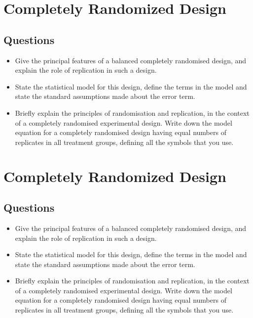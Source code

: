 \documentclass[]{article}
\begin{document}
\section{Completely Randomized Design}

\subsection{Questions}
\begin{itemize}
	\item Give the principal features of a  balanced completely randomised design, and
	explain the role of replication in such a design.  \item State the statistical model for
	this design, define the terms in the model and state the standard assumptions
	made about the error term.
	\item Briefly explain the principles of randomisation and replication, in the
	context of a completely randomised experimental design. Write down the model equation for a completely randomised design
	having equal numbers of replicates in all treatment groups, defining all
	the symbols that you use.
\end{itemize}\section{Completely Randomized Design}

\subsection{Questions}
\begin{itemize}
	\item Give the principal features of a  balanced completely randomised design, and
	explain the role of replication in such a design.  \item State the statistical model for
	this design, define the terms in the model and state the standard assumptions
	made about the error term.
	\item Briefly explain the principles of randomisation and replication, in the
	context of a completely randomised experimental design. Write down the model equation for a completely randomised design
	having equal numbers of replicates in all treatment groups, defining all
	the symbols that you use.
\end{itemize}
\end{document}
